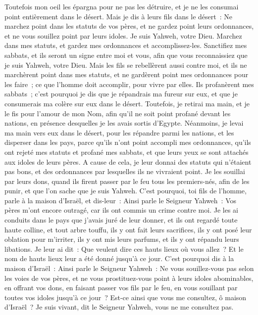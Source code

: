 \begin{multicols}{2}
Toutefois mon oeil les épargna pour ne pas les détruire, et je ne les consumai point entièrement dans le désert.
Mais je dis à leurs fils dans le désert~: Ne marchez point dans les statuts de vos pères, et ne gardez point leurs ordonnances, et ne vous souillez point par leurs idoles.
Je suis Yahweh, votre Dieu. Marchez dans mes statuts, et gardez mes ordonnances et accomplissez-les.
Sanctifiez mes sabbats, et ils seront un signe entre moi et vous, afin que vous reconnaissiez que je suis Yahweh, votre Dieu.
Mais les fils se rebellèrent aussi contre moi, et ils ne marchèrent point dans mes statuts, et ne gardèrent point mes ordonnances pour les faire~; ce que l'homme doit accomplir, pour vivre par elles. Ils profanèrent mes sabbats~; c'est pourquoi je dis que je répandrais ma fureur sur eux, et que je consumerais ma colère sur eux dans le désert.
Toutefois, je retirai ma main, et je le fis pour l'amour de mon Nom, afin qu'il ne soit point profané devant les nations, en présence desquelles je les avais sortis d'Egypte.
Néanmoins, je levai ma main vers eux dans le désert, pour les répandre parmi les nations, et les disperser dans les pays,
parce qu'ils n'ont point accompli mes ordonnances, qu'ils ont rejeté mes statuts et profané mes sabbats, et que leurs yeux se sont attachés aux idoles de leurs pères.
A cause de cela, je leur donnai des statuts qui n'étaient pas bons, et des ordonnances par lesquelles ils ne vivraient point.
Je les souillai par leurs dons, quand ils firent passer par le feu tous les premiers-nés, afin de les punir, et que l'on sache que je suis Yahweh.
C'est pourquoi, toi fils de l'homme, parle à la maison d'Israël, et dis-leur~: Ainsi parle le Seigneur Yahweh~: Vos pères m'ont encore outragé, car ils ont commis un crime contre moi.
Je les ai conduits dans le pays que j'avais juré de leur donner, et ils ont regardé toute haute colline, et tout arbre touffu, ils y ont fait leurs sacrifices, ils y ont posé leur oblation pour m'irriter, ils y ont mis leurs parfums, et ils y ont répandu leurs libations.
Je leur ai dit~: Que veulent dire ces hauts lieux où vous allez~? Et le nom de hauts lieux leur a été donné jusqu'à ce jour.
C'est pourquoi dis à la maison d'Israël~: Ainsi parle le Seigneur Yahweh~: Ne vous souillez-vous pas selon les voies de vos pères, et ne vous prostituez-vous point à leurs idoles abominables,
en offrant vos dons, en faisant passer vos fils par le feu, en vous souillant par toutes vos idoles jusqu'à ce jour~? Est-ce ainsi que vous me consultez, ô maison d'Israël~? Je suis vivant, dit le Seigneur Yahweh, vous ne me consultez pas.

\end{multicols}
